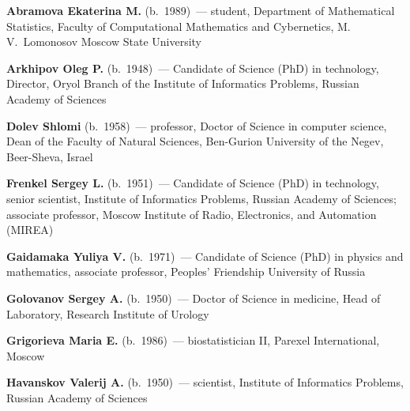 \begin{multicols}{2}



\noindent
\textbf{Abramova Ekaterina M.} (b.\ 1989)~--- student, Department of Mathematical 
Statistics, Faculty of Computational Mathematics and Cybernetics, 
M.\,V.~Lomonosov Moscow State University

\vspace*{3pt}

\noindent
\textbf{Arkhipov Oleg P.} (b.\ 1948)~--- Candidate of Science (PhD) in technology, 
Director, Oryol Branch of the Institute of Informatics Problems, Russian Academy 
of Sciences 


\vspace*{3pt}

\noindent
\textbf{Dolev Shlomi} (b.\ 1958)~--- professor, Doctor of Science in computer science, Dean 
of the Faculty of Natural Sciences, Ben-Gurion University of the Negev, 
Beer-Sheva, Israel 

\vspace*{3pt}

\noindent
\textbf{Frenkel Sergey L.} (b.\ 1951)~--- Candidate of Science (PhD) in 
technology, senior scientist, Institute of Informatics Problems, Russian 
Academy of Sciences; associate professor, Moscow Institute of Radio, 
Electronics, and Automation (MIREA)

\vspace*{3pt}

\noindent \textbf{Gaidamaka Yuliya V.} (b.\ 1971)~--- Candidate of Science 
(PhD) in physics and mathematics, associate professor, Peoples' Friendship 
University of Russia

\vspace*{3pt}

\noindent\textbf{Golovanov Sergey  A.} (b.\ 1950)~--- Doctor of Science in medicine, Head of 
Laboratory, Research Institute of Urology 

\vspace*{3pt}

\noindent \textbf{Grigorieva Maria E.} (b.\ 1986)~--- biostatistician II, 
Parexel International, Moscow
 

\vspace*{3pt}

\noindent
\textbf{Havanskov Valerij A.} (b.\ 1950)~--- scientist, Institute of Informatics Problems, 
Russian Academy of Sciences

\vspace*{3pt}


\end{multicols}
